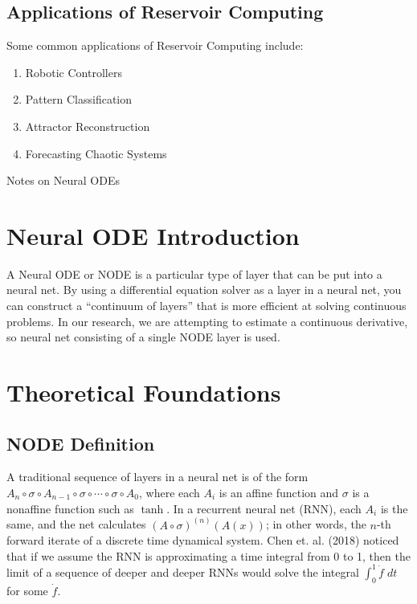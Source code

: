 \documentclass[12pt,oneside]{article}
\theoremstyle{plain}
\begin{document}
\subsection{Applications of Reservoir Computing}
Some common applications of Reservoir Computing include:
\begin{enumerate}
    \item Robotic Controllers
    \item Pattern Classification
    \item Attractor Reconstruction
    \item Forecasting Chaotic Systems
\end{enumerate}

\pagebreak


\begin{center}
    \LARGE Notes on Neural ODEs \\
\end{center}


\section{Neural ODE Introduction}
A Neural ODE or NODE is a particular type of layer that can be put into a neural net. By using a differential equation solver as a layer in a neural net, you can construct a ``continuum of layers'' that is more efficient at solving continuous problems. In our research, we are attempting to estimate a continuous derivative, so neural net consisting of a single NODE layer is used.



\section{Theoretical Foundations}
\subsection{NODE Definition}
A  traditional sequence of layers in a neural net is of the form $A_n \circ \sigma \circ A_{n-1} \circ \sigma \circ \cdots \circ \sigma \circ A_0$, where each $A_i$ is an affine function and $\sigma$ is a nonaffine function such as $\tanh$. In a recurrent neural net (RNN), each $A_i$ is the same, and the net calculates $(A\circ \sigma)^{(n)}(A(x))$; in other words, the $n$-th forward iterate of a discrete time dynamical system. Chen et. al. (2018) noticed that if we assume the RNN is approximating a time integral from 0 to 1, then the limit of a sequence of deeper and deeper RNNs would solve the integral $\int_0^1 \dot f \; dt$ for some $\dot f$. 
\end{document}
